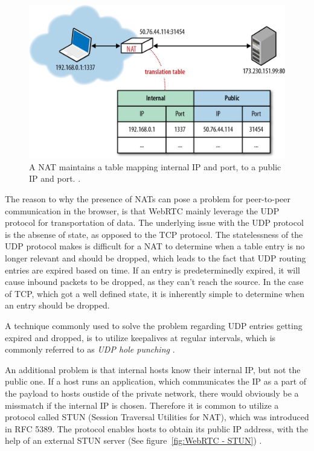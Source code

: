 \begin{figure}[htp]
\centering
\includegraphics[width=\textwidth,height=0.2\paperheight,keepaspectratio
]{figures/nat}
\caption{A NAT maintains a table mapping internal IP and port, to a public IP and port. \cite{NATIllustration:Online}.}
\label{fig:NAT}
\end{figure}

The reason to why the presence of NATs can pose a problem for peer-to-peer communication in the browser, is that WebRTC mainly leverage the UDP protocol for transportation of data. The underlying issue with the UDP protocol is the absense of state, as opposed to the TCP protocol. The statelessness of the UDP protocol makes is difficult for a NAT to determine when a table entry is no longer relevant and should be dropped, which leads to the fact that UDP routing entries are expired based on time. If an entry is predeterminedly expired, it will cause inbound packets to be dropped, as they can’t reach the source. In the case of TCP, which got a well defined state, it is inherently simple to determine when an entry should be dropped.

A technique commonly used to solve the problem regarding UDP entries getting expired and dropped, is to utilize keepalives at regular intervals, which is commonly referred to as \emph{UDP hole punching} \cite{UDPHolePunching:Online}.

An additional problem is that internal hosts know their internal IP, but not the public one. If a host runs an application, which communicates the IP as a part of the payload to hosts oustide of the private network, there would obviously be a missmatch if the internal IP is chosen. Therefore it is common to utilize a protocol called STUN (Session Traversal Utilities for NAT), which was introduced in RFC 5389. The protocol enables hosts to obtain its public IP address, with the help of an external STUN server (See figure~\ref{fig:WebRTC - STUN}) \cite{RFC5389:Online}.

